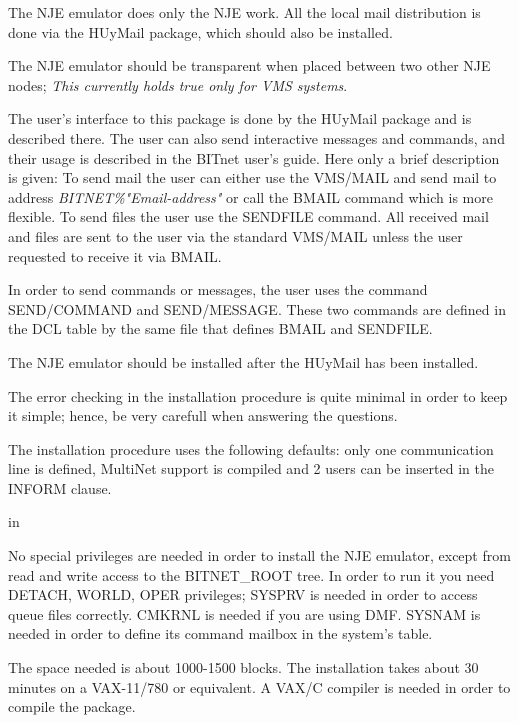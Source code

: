 The NJE  emulator  does  only  the  NJE  work.  All  the  local  mail
distribution  is  done  via  the  HUyMail  package, which should also be
installed.

The NJE emulator should be transparent when placed between two  other
NJE nodes; {\sl This currently holds true only for VMS systems}.

The  user's  interface to this package is done by the HUyMail package
and is described there. The user can also send interactive messages  and
commands,  and their usage is described in the BITnet user's guide. Here
only a brief description is given:
To send mail the user can either use the {\ncrBold VMS/MAIL} and send mail to
address {\sl BITNET\%"Email-address"} or call the
{\ncrBold BMAIL} command which is more
flexible. To send files the user use the {\ncrBold SENDFILE} command.
All  received
mail and files are sent to the user via the standard {\ncrBold VMS/MAIL}
unless the user requested to receive it via {\ncrBold BMAIL}.

In  order  to  send  commands  or messages, the user uses the command
{\ncrBold SEND/COMMAND} and {\ncrBold SEND/MESSAGE}.
These two commands are defined in the DCL
table by the same file that defines BMAIL and SENDFILE.

\vfill\eject


The  NJE  emulator  should  be  installed  after the HUyMail has been
installed.

The error checking in the installation procedure is quite minimal  in
order  to  keep  it  simple;  hence, be very carefull when answering the
questions.

The installation procedure uses  the  following  defaults:  only  one
communication  line is defined, MultiNet support is compiled and 2 users
can be inserted in the INFORM clause.

 in

No special  privileges  are  needed  in  order  to  install  the  NJE
emulator,  except from read and write access to the BITNET\_ROOT tree. In
order to run it you need  DETACH,  WORLD,  OPER  privileges;  SYSPRV  is
needed in order to access queue files correctly. CMKRNL is needed if you
are using DMF. SYSNAM is needed in order to define its  command  mailbox
in the system's table.

The  space  needed  is about 1000-1500 blocks. The installation takes
about 30 minutes on a VAX-11/780 or equivalent.
A VAX/C compiler is needed in order to compile the package.

